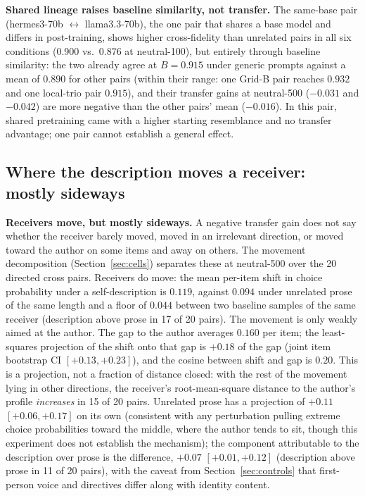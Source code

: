\documentclass[11pt]{article}
\newcommand{\B}{B}
\begin{document}
\textbf{Shared lineage raises baseline similarity, not transfer.} The
same-base pair (hermes3-70b $\leftrightarrow$ llama3.3-70b), the one pair
that shares a base model and differs in post-training, shows higher
cross-fidelity than unrelated pairs in all six conditions (0.900 vs.\ 0.876
at neutral-100), but entirely through baseline similarity: the two already
agree at $\B = 0.915$ under generic prompts against a mean of $0.890$ for
other pairs (within their range: one Grid-B pair reaches $0.932$ and one
local-trio pair $0.915$), and their transfer gains at neutral-500 ($-0.031$ and $-0.042$) are more
negative than the other pairs' mean ($-0.016$). In this pair, shared
pretraining came with a higher starting resemblance and no transfer
advantage; one pair cannot establish a general effect.

\subsection{Where the description moves a receiver: mostly sideways}
\label{sec:movement}
\textbf{Receivers move, but mostly sideways.} A negative transfer gain does
not say whether the receiver barely moved,
moved in an irrelevant direction, or moved toward the author on some items
and away on others. The movement decomposition (Section~\ref{sec:cells})
separates these at neutral-500 over the 20 directed cross pairs. Receivers
do move: the mean per-item shift in choice probability under a
self-description is $0.119$, against $0.094$ under unrelated prose of the
same length and a floor of $0.044$ between two baseline samples of the same
receiver (description above prose in 17 of 20 pairs). The movement is only
weakly aimed at the author. The gap to the author averages $0.160$ per item;
the least-squares projection of the shift onto that gap is $+0.18$ of the
gap (joint item bootstrap CI $[+0.13, +0.23]$), and the cosine between shift
and gap is $0.20$. This is a projection, not a fraction of distance closed:
with the rest of the movement lying in other directions, the receiver's
root-mean-square distance to the author's profile \emph{increases} in 15 of
20 pairs. Unrelated prose has a projection of $+0.11$ $[+0.06, +0.17]$ on
its own (consistent with any perturbation pulling extreme choice
probabilities toward the middle, where the author tends to sit, though this
experiment does not establish the mechanism); the component attributable to
the description over prose is the difference, $+0.07$ $[+0.01, +0.12]$
(description above prose in 11 of 20 pairs), with the caveat from
Section~\ref{sec:controls} that first-person voice and directives differ
along with identity content.
\end{document}
